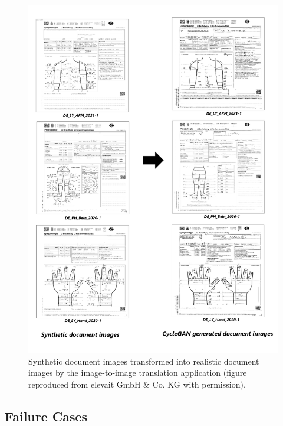 \begin{figure}[H]
        \begin{center}
	    \includegraphics[scale=0.30]{images/Evaluation/Qualitative_Results.png}
	    \caption[Synthetic document images transformed into realistic document images by the image-to-image translation application.]{Synthetic document images transformed into realistic document images by the image-to-image translation application (figure reproduced from elevait GmbH \& Co. KG with permission).}
	    \label{fig:QualitativeResults}
	    \end{center}
\end{figure}






\subsection{Failure Cases}\label{FailureCases}

